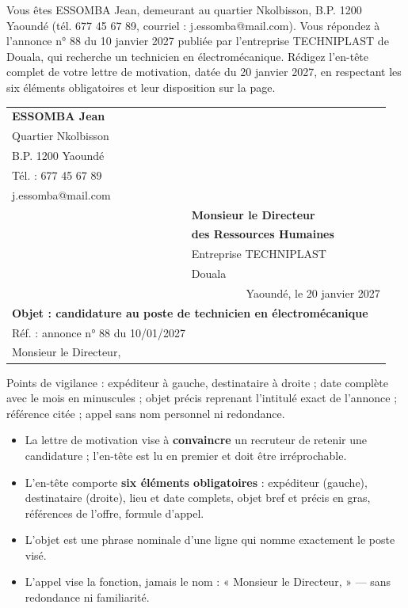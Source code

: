 \documentclass[11pt]{article}
\begin{document}
\begin{exercice}
Vous êtes ESSOMBA Jean, demeurant au quartier Nkolbisson, B.P. 1200 Yaoundé (tél. 677 45 67 89, courriel : j.essomba@mail.com). Vous répondez à l'annonce n° 88 du 10 janvier 2027 publiée par l'entreprise TECHNIPLAST de Douala, qui recherche un technicien en électromécanique. Rédigez l'en-tête complet de votre lettre de motivation, datée du 20 janvier 2027, en respectant les six éléments obligatoires et leur disposition sur la page.
\end{exercice}

\begin{corrige}
\begin{tabular}{p{0.45\linewidth}p{0.5\linewidth}}
\textbf{ESSOMBA Jean} & \\
Quartier Nkolbisson & \\
B.P. 1200 Yaoundé & \\
Tél. : 677 45 67 89 & \\
j.essomba@mail.com & \\
 & \textbf{Monsieur le Directeur}\\
 & \textbf{des Ressources Humaines}\\
 & Entreprise TECHNIPLAST\\
 & Douala\\[0.3em]
\multicolumn{2}{r}{Yaoundé, le 20 janvier 2027}\\[0.3em]
\multicolumn{2}{l}{\textbf{Objet : candidature au poste de technicien en électromécanique}}\\
\multicolumn{2}{l}{Réf. : annonce n° 88 du 10/01/2027}\\[0.3em]
\multicolumn{2}{l}{Monsieur le Directeur,}\\
\end{tabular}

\smallskip
Points de vigilance : expéditeur à gauche, destinataire à droite ; date complète avec le mois en minuscules ; objet précis reprenant l'intitulé exact de l'annonce ; référence citée ; appel sans nom personnel ni redondance.
\end{corrige}

\begin{aretenir}
\begin{itemize}
\item La lettre de motivation vise à \textbf{convaincre} un recruteur de retenir une candidature ; l'en-tête est lu en premier et doit être irréprochable.
\item L'en-tête comporte \textbf{six éléments obligatoires} : expéditeur (gauche), destinataire (droite), lieu et date complets, objet bref et précis en gras, références de l'offre, formule d'appel.
\item L'objet est une phrase nominale d'une ligne qui nomme exactement le poste visé.
\item L'appel vise la fonction, jamais le nom : « Monsieur le Directeur, » — sans redondance ni familiarité.
\end{itemize}
\end{aretenir}
\end{document}
